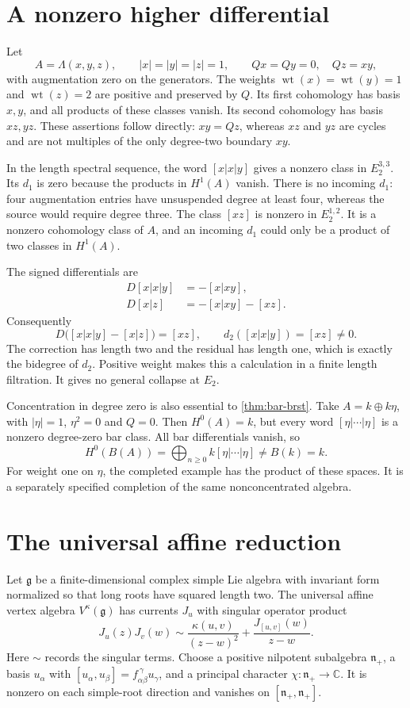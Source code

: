 \section{A nonzero higher differential}
Let
\[
 A=\Lambda(x,y,z),\qquad |x|=|y|=|z|=1,
 \qquad Qx=Qy=0,\quad Qz=xy,
\]
with augmentation zero on the generators.
The weights $\operatorname{wt}(x)=\operatorname{wt}(y)=1$ and
$\operatorname{wt}(z)=2$ are positive and preserved by $Q$.
Its first cohomology has basis $x,y$, and all products of these
classes vanish.  Its second cohomology has basis $xz,yz$.
These assertions follow directly: $xy=Qz$, whereas $xz$ and $yz$
are cycles and are not multiples of the only degree-two boundary
$xy$.

In the length spectral sequence, the word $[x|x|y]$ gives
a nonzero class in $E_2^{3,3}$.
Its $d_1$ is zero because the products in $H^1(A)$ vanish.
There is no incoming $d_1$: four augmentation entries have
unsuspended degree at least four, whereas the source would
require degree three.
The class $[xz]$ is nonzero in $E_2^{1,2}$.
It is a nonzero cohomology class of $A$, and an incoming $d_1$
could only be a product of two classes in $H^1(A)$.

The signed differentials are
\begin{align*}
 D[x|x|y]&=-[x|xy],\\
 D[x|z]&=-[x|xy]-[xz].
\end{align*}
Consequently
\[
 D\bigl([x|x|y]-[x|z]\bigr)=[xz],
 \qquad d_2([x|x|y])=[xz]\ne0.
\]
The correction has length two and the residual has length one,
which is exactly the bidegree of $d_2$.
Positive weight makes this a calculation in a finite length
filtration.  It gives no general collapse at $E_2$.

Concentration in degree zero is also essential to
\cref{thm:bar-brst}.
Take $A=k\oplus k\eta$, with $|\eta|=1$, $\eta^2=0$ and $Q=0$.
Then $H^0(A)=k$, but every word $[\eta|\cdots|\eta]$ is a
nonzero degree-zero bar class.
All bar differentials vanish, so
\[
 H^0(B(A))=\bigoplus_{n\geq0}k[\eta|\cdots|\eta]
 \ne B(k)=k.
\]
For weight one on $\eta$, the completed example has the product
of these spaces.  It is a separately specified completion of
the same nonconcentrated algebra.

\section{The universal affine reduction}
Let $\mathfrak g$ be a finite-dimensional complex simple Lie
algebra with invariant form normalized so that long roots have
squared length two.
The universal affine vertex algebra $V^\kappa(\mathfrak g)$ has
currents $J_u$ with singular operator product
\[
 J_u(z)J_v(w)\sim
 \frac{\kappa(u,v)}{(z-w)^2}+\frac{J_{[u,v]}(w)}{z-w}.
\]
Here $\sim$ records the singular terms.
Choose a positive nilpotent subalgebra $\mathfrak n_+$, a basis
$u_\alpha$ with
$[u_\alpha,u_\beta]=f_{\alpha\beta}^{\ \gamma}u_\gamma$,
and a principal character $\chi:\mathfrak n_+\to\mathbb C$.
It is nonzero on each simple-root direction and vanishes on
$[\mathfrak n_+,\mathfrak n_+]$.

